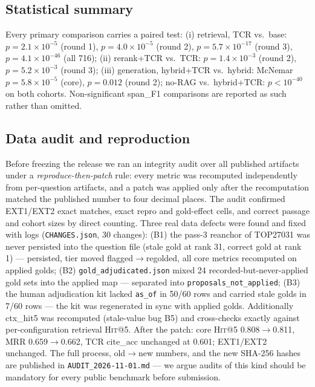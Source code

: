 \documentclass[10pt,a4paper,twocolumn]{article}
\newcommand{\hit}{\textsc{Hit}}
\newcommand{\code}[1]{\texttt{#1}}
\begin{document}
\subsection{Statistical summary}

Every primary comparison carries a paired test: (i) retrieval, TCR vs.\ base: $p=2.1\times10^{-5}$ (round 1), $p=4.0\times10^{-5}$ (round 2), $p=5.7\times10^{-17}$ (round 3), $p=4.1\times10^{-46}$ (all 716); (ii) rerank+TCR vs.\ TCR: $p=1.4\times10^{-3}$ (round 2), $p=5.2\times10^{-3}$ (round 3); (iii) generation, hybrid+TCR vs.\ hybrid: McNemar $p=5.8\times10^{-5}$ (core), $p=0.012$ (round 2); no-RAG vs.\ hybrid+TCR: $p<10^{-40}$ on both cohorts. Non-significant span\_F1 comparisons are reported as such rather than omitted.

\subsection{Data audit and reproduction}
\label{sec:audit}

Before freezing the release we ran an integrity audit over all published artifacts under a \emph{reproduce-then-patch} rule: every metric was recomputed independently from per-question artifacts, and a patch was applied only after the recomputation matched the published number to four decimal places. The audit confirmed EXT1/EXT2 exact matches, exact repro and gold-effect cells, and correct passage and cohort sizes by direct counting. Three real data defects were found and fixed with logs (\code{CHANGES.json}, 30 changes): (B1) the pass-3 reanchor of TOP27031 was never persisted into the question file (stale gold at rank 31, correct gold at rank 1) --- persisted, tier moved flagged$\rightarrow$regolded, all core metrics recomputed on applied golds; (B2) \code{gold\_adjudicated.json} mixed 24 recorded-but-never-applied gold sets into the applied map --- separated into \code{proposals\_not\_applied}; (B3) the human adjudication kit lacked \code{as\_of} in 50/60 rows and carried stale golds in 7/60 rows --- the kit was regenerated in sync with applied golds. Additionally ctx\_hit5 was recomputed (stale-value bug B5) and cross-checks exactly against per-configuration retrieval \hit{}@5. After the patch: core \hit{}@5 0.808$\rightarrow$0.811, MRR 0.659$\rightarrow$0.662, TCR cite\_acc unchanged at 0.601; EXT1/EXT2 unchanged. The full process, old$\rightarrow$new numbers, and the new SHA-256 hashes are published in \code{AUDIT\_2026-11-01.md} --- we argue audits of this kind should be mandatory for every public benchmark before submission.
\end{document}
